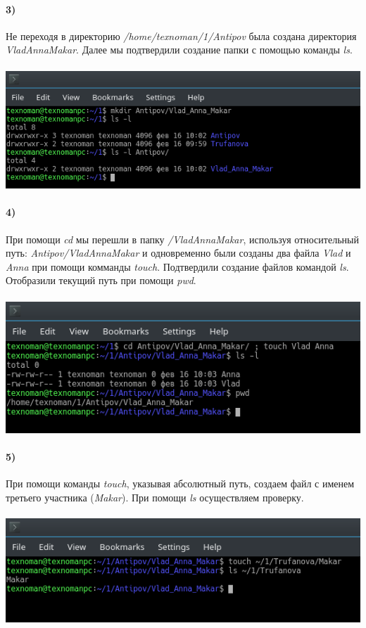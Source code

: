 	\paragraph{3)}
	Не переходя в директорию \textit{/home/texnoman/1/Antipov} была создана директория \textit{VladAnnaMakar}. Далее мы подтвердили создание папки с помощью команды \textit{ls}.\\
	\\
	\includegraphics[width=\textwidth ]{3.png}

	\paragraph{4)}
	При помощи \textit{cd} мы перешли в папку \textit{/VladAnnaMakar}, используя относительный путь: \textit{Antipov/VladAnnaMakar} и одновременно были созданы два файла \textit{Vlad} и \textit{Anna} при помощи комманды \textit{touch}. Подтвердили создание файлов командой \textit{ls}. Отобразили текущий путь при помощи \textit{pwd}.\\
	\\
	\includegraphics[width=\textwidth]{4.png}

	\paragraph{5)}
	При помощи команды \textit{touch}, указывая абсолютный путь, создаем файл с именем третьего участника (\textit{Makar}). При помощи \textit{ls} осуществляем проверку.\\
	\\
	\includegraphics[width=\textwidth]{5.png}

